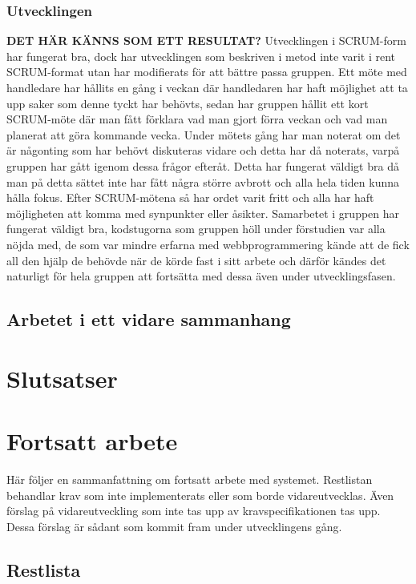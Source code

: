 \documentclass{article}
\begin{document}
\subsubsection{Utvecklingen}
\textbf{DET HÄR KÄNNS SOM ETT RESULTAT?}
Utvecklingen i SCRUM-form har fungerat bra, dock har utvecklingen som beskriven i metod inte varit i rent SCRUM-format utan har modifierats för att bättre passa gruppen. Ett möte med handledare har hållits en gång i veckan där handledaren har haft möjlighet att ta upp saker som denne tyckt har behövts, sedan har gruppen hållit ett kort SCRUM-möte där man fått förklara vad man gjort förra veckan och vad man planerat att göra kommande vecka. Under mötets gång har man noterat om det är någonting som har behövt diskuteras vidare och detta har då noterats, varpå gruppen har gått igenom dessa frågor efteråt. Detta har fungerat väldigt bra då man på detta sättet inte har fått några större avbrott och alla hela tiden kunna hålla fokus. Efter SCRUM-mötena så har ordet varit fritt och alla har haft möjligheten att komma med synpunkter eller åsikter. Samarbetet i gruppen har fungerat väldigt bra, kodstugorna som gruppen höll under förstudien var alla nöjda med, de som var mindre erfarna med webbprogrammering kände att de fick all den hjälp de behövde när de körde fast i sitt arbete och därför kändes det naturligt för hela gruppen att fortsätta med dessa även under utvecklingsfasen.

\subsection{Arbetet i ett vidare sammanhang}

\section{Slutsatser}

\section{Fortsatt arbete}
Här följer en sammanfattning om fortsatt arbete med systemet. Restlistan behandlar krav som inte implementerats eller som borde vidareutvecklas. Även förslag på vidareutveckling som inte tas upp av kravspecifikationen tas upp. Dessa förslag är sådant som kommit fram under utvecklingens gång.

\subsection{Restlista}
\end{document}
